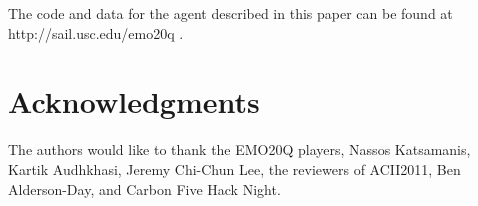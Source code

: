 \documentclass[a4paper]{article}
\begin{document}
The code and data for the agent described in this paper can be found at http://sail.usc.edu/emo20q .


\section{Acknowledgments}


The authors would like to thank the EMO20Q players, Nassos Katsamanis, Kartik
Audhkhasi, Jeremy Chi-Chun Lee, the reviewers of ACII2011, Ben Alderson-Day,
and Carbon Five Hack Night.


\eightpt

%

\end{document}
